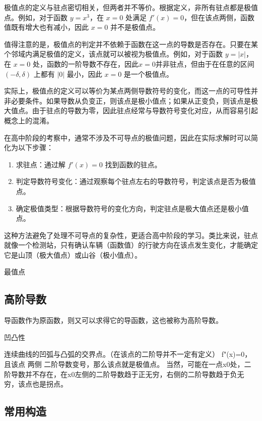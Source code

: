 极值点的定义与驻点密切相关，但两者并不等价。根据定义，非所有驻点都是极值点。例如，对于函数 $y = x^3$，在 $x = 0$ 处满足 $f'(x) = 0$，但在该点两侧，函数值既有增大也有减小，因此 $x = 0$ 并不是极值点。

值得注意的是，极值点的判定并不依赖于函数在这一点的导数是否存在。只要在某个邻域内满足极值的定义，该点就可以被视为极值点。例如，对于函数 $y = |x|$，在 $x = 0$ 处，函数的一阶导数不存在，因此$x = 0$并非驻点，但由于在任意的区间 $(-\delta, \delta)$ 上都有 $|0|$ 最小，因此 $x = 0$ 是一个极值点。

实际上，极值点的定义可以等价为某点两侧导数符号的变化，而这一点的可导性并非必要条件。如果导数从负变正，则该点是极小值点；如果从正变负，则该点是极大值点。由于驻点的导数为零，因此驻点经常与导数符号变化对应，从而容易引起概念上的混淆。

在高中阶段的考察中，通常不涉及不可导点的极值问题，因此在实际求解时可以简化为以下步骤：
\begin{enumerate}
\item 求驻点：通过解 $f'(x) = 0$ 找到函数的驻点。
\item 判定导数符号变化：通过观察每个驻点左右的导数符号，判定该点是否为极值点。
\item 确定极值类型：根据导数符号的变化方向，判定驻点是极大值点还是极小值点。
\end{enumerate}

这种方法避免了处理不可导点的复杂性，更适合高中阶段的学习。类比来说，驻点就像一个检测站，只有确认车辆（函数值）的行驶方向在该点发生变化，才能确定它是山顶（极大值点）或山谷（极小值点）。


最值点

\subsection{高阶导数}

导函数作为原函数，则又可以求得它的导函数，这也被称为高阶导数。

凹凸性

连续曲线的凹弧与凸弧的交界点。（在该点的二阶导并不一定有定义）
f"(x)=0，且该点 两侧 二阶导数变号，那么该点就是极值点。
当然，可能在一点x0处，二阶导数并不存在，在x0左侧的二阶导数趋于正无穷，右侧的二阶导数趋于负无穷，该点也是拐点。

\subsection{常用构造}


